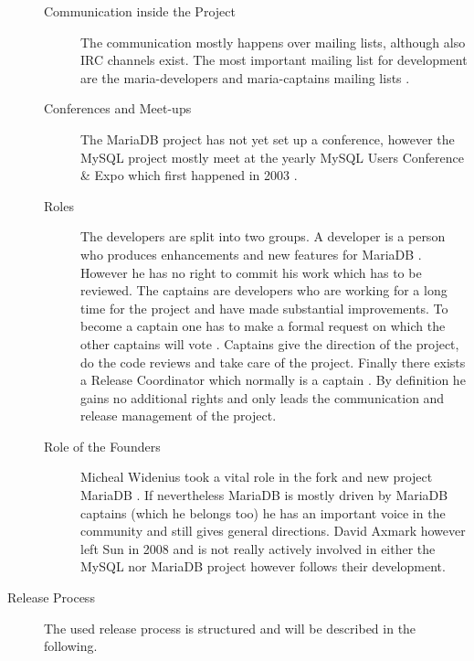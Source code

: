 \begin{description}
\begin{description}
    \item[Communication inside the Project] The communication mostly happens
      over mailing lists, although also \ac{IRC} channels exist. The most
      important mailing list for development are the maria-developers and
      maria-captains mailing lists \cite{MySQLDevelopers}.

    \item[Conferences and Meet-ups] The MariaDB project has not yet set up a
      conference, however the MySQL project mostly meet at the yearly MySQL
      Users Conference \& Expo which first happened in 2003
      \cite{MySQLConference}.

    \item[Roles] The developers are split into two groups. A developer is a
      person who produces enhancements and new features for MariaDB
      \cite{MySQLContributingCode,MySQLContributing,MySQLCaptain}. However he
      has no right to commit his work which has to be reviewed. The captains
      are developers who are working for a long time for the project and have
      made substantial improvements. To become a captain one has to make a
      formal request on which the other captains will vote \cite{MySQLCaptain}.
      Captains give the direction of the project, do the code reviews and take
      care of the project. Finally there exists a Release Coordinator which
      normally is a captain \cite{MySQLReleaseCoordinator}. By definition he
      gains no additional rights and only leads the communication and release
      management of the project.

    \item[Role of the Founders] Micheal Widenius took a vital role in the fork
      and new project MariaDB \cite{MySQLBehind,MySQLAbout}. If nevertheless
      MariaDB is mostly driven by MariaDB captains (which he belongs too) he
      has an important voice in the community and still gives general
      directions. David Axmark however left Sun in 2008 and is not really
      actively involved in either the MySQL nor MariaDB project however follows
      their development.

  \end{description}

  \item[Release Process] The used release process is structured and will be
    described in the following.

  \begin{description}


\end{description}
\end{description}
